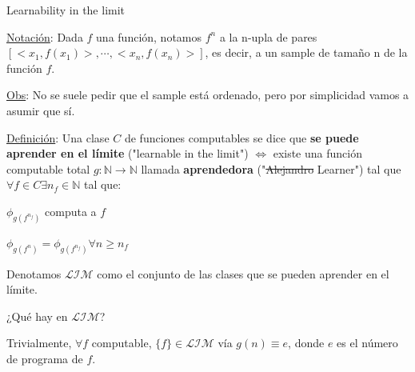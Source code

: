 \documentclass[10pt]{beamer}
\begin{document}
\begin{frame}{Learnability in the limit}

\underline{Notación}: Dada $f$ una función, notamos $f^{n}$ a la n-upla de pares $[<x_1,f(x_1)>,\cdots,<x_n,f(x_n)>]$, es decir, a un sample de tamaño n de la función $f$.

\underline{Obs}: No se suele pedir que el sample está ordenado, pero por simplicidad vamos a asumir que sí.




\underline{Definición}: Una clase $C$ de funciones computables se dice que \textbf{se puede aprender en el límite} ("learnable in the limit") $\Leftrightarrow$ existe una función computable total $g : \mathbb{N} \rightarrow \mathbb{N}$ llamada \textbf{aprendedora} ("\st{Alejandro} Learner") tal que $\forall f \in C \exists n_f \in \mathbb{N}$ tal que:

\begin{itemize}


\huge{ \item $\phi_{g(f^{n_f})}$ computa a $f$} 

\item $\phi_{g(f^{n})} = \phi_{g(f^{n_f})} \forall n \geq n_f$
\end{itemize}

Denotamos $\mathcal{LIM}$ como el conjunto de las clases que se pueden aprender en el límite.

\end{frame}


\begin{frame}{¿Qué hay en $\mathcal{LIM}$?}

Trivialmente, $\forall f$ computable, $\{f\} \in \mathcal{LIM}$ vía $g(n) \equiv e$, donde $e$ es el número de programa de $f$.





\end{frame}
\end{document}
